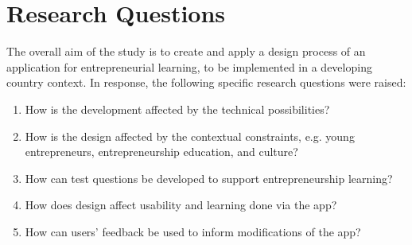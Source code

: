 \section{Research Questions}

The overall aim of the study is to create and apply a design process of an application for entrepreneurial learning, to be implemented in a developing country context. In response, the following specific research questions were raised:

\begin{enumerate}
    \item How is the development affected by the technical possibilities?

    \item How is the design affected by the contextual  constraints, e.g. young entrepreneurs, entrepreneurship education, and culture? %


    \item How can test questions be developed to support entrepreneurship learning? %

    \item How does design affect usability and learning done via the app? %

    \item How can users' feedback be used to inform modifications of the app?

\end{enumerate}




